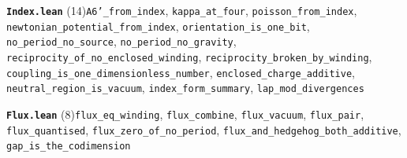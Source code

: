 \documentclass[11pt,a4paper]{article}
\theoremstyle{sudef}
\begin{document}
\noindent\textbf{\texttt{Index.lean}} (14)\quad \texttt{A6'\_\allowbreak from\_\allowbreak index}, \texttt{kappa\_\allowbreak at\_\allowbreak four}, \texttt{poisson\_\allowbreak from\_\allowbreak index}, \texttt{newtonian\_\allowbreak potential\_\allowbreak from\_\allowbreak index}, \texttt{orientation\_\allowbreak is\_\allowbreak one\_\allowbreak bit}, \texttt{no\_\allowbreak period\_\allowbreak no\_\allowbreak source}, \texttt{no\_\allowbreak period\_\allowbreak no\_\allowbreak gravity}, \texttt{reciprocity\_\allowbreak of\_\allowbreak no\_\allowbreak enclosed\_\allowbreak winding}, \texttt{reciprocity\_\allowbreak broken\_\allowbreak by\_\allowbreak winding}, \texttt{coupling\_\allowbreak is\_\allowbreak one\_\allowbreak dimensionless\_\allowbreak number}, \texttt{enclosed\_\allowbreak charge\_\allowbreak additive}, \texttt{neutral\_\allowbreak region\_\allowbreak is\_\allowbreak vacuum}, \texttt{index\_\allowbreak form\_\allowbreak summary}, \texttt{lap\_\allowbreak mod\_\allowbreak divergences}\par\smallskip
\noindent\textbf{\texttt{Flux.lean}} (8)\quad \texttt{flux\_\allowbreak eq\_\allowbreak winding}, \texttt{flux\_\allowbreak combine}, \texttt{flux\_\allowbreak vacuum}, \texttt{flux\_\allowbreak pair}, \texttt{flux\_\allowbreak quantised}, \texttt{flux\_\allowbreak zero\_\allowbreak of\_\allowbreak no\_\allowbreak period}, \texttt{flux\_\allowbreak and\_\allowbreak hedgehog\_\allowbreak both\_\allowbreak additive}, \texttt{gap\_\allowbreak is\_\allowbreak the\_\allowbreak codimension}\par\smallskip
\end{document}
